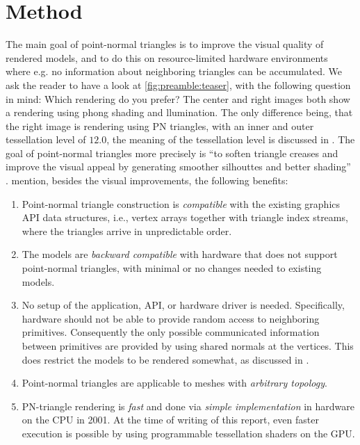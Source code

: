 
\section{Method}
\label{s:method}
%
The main goal of point-normal triangles is to improve the visual quality of rendered models, and to do this on resource-limited hardware environments where e.g. no information about neighboring triangles can be accumulated. We ask the reader to have a look at \cref{fig:preamble:teaser}, with the following question in mind: Which rendering do you prefer? The center and right images both show a rendering using phong shading and llumination. The only difference being, that the right image is rendering using PN triangles, with an inner and outer tessellation level of $12.0$, the meaning of the tessellation level is discussed in . The goal of point-normal triangles more precisely is ``to soften triangle creases and improve the visual appeal by generating smoother silhouttes and better shading'' \cite{vlachos2001curved}. \citeauthor{vlachos2001curved} mention, besides the visual improvements, the following benefits:

\begin{enumerate}[label=(\roman*)]
 	\item 
 		Point-normal triangle construction is \textit{compatible} with the existing graphics API data structures, i.e., vertex arrays together with triangle index streams, where the triangles arrive in unpredictable order.
 	\item 
 		The models are \textit{backward compatible} with hardware that does not support point-normal triangles, with minimal or no changes needed to existing models.
 	\item 
 		No setup of the application, API, or hardware driver is needed. Specifically, hardware should not be able to provide random access to neighboring primitives. Consequently the only possible communicated information between primitives are provided by using shared normals at the vertices. This does restrict the models to be rendered somewhat, as discussed in .
 	\item 
 		Point-normal triangles are applicable to meshes with \textit{arbitrary topology}.
 	\item 
 		PN-triangle rendering is \textit{fast} and done via \textit{simple implementation} in hardware on the CPU in 2001. At the time of writing of this report, even faster execution is possible by using programmable tessellation shaders on the GPU.
 \end{enumerate} 

